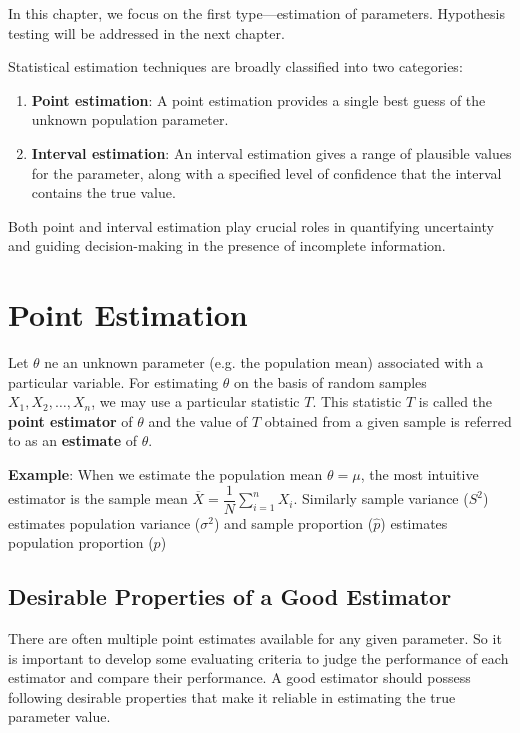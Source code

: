 \documentclass[twoside]{book}
\begin{document}
In this chapter, we focus on the first type—{estimation of parameters}. Hypothesis testing will be addressed in the next chapter.

Statistical estimation techniques are broadly classified into two categories:

\begin{enumerate}
    \item \textbf{Point estimation}: A point estimation provides a single best guess of the unknown population parameter.

    \item \textbf{Interval estimation}: An interval estimation gives a range of plausible values for the parameter, along with a specified level of confidence that the interval contains the true value.
\end{enumerate}

Both point and interval estimation play crucial roles in quantifying uncertainty and guiding decision-making in the presence of incomplete information.


\section{Point Estimation}
Let $\theta$ ne an unknown parameter (e.g. the population mean) associated with a particular variable. For estimating $\theta$ on the basis of random samples $X_1, X_2, \dots, X_n$, we may use a particular statistic $ T $. This statistic $T$ is called the \textbf{point estimator} of $\theta$ and the value of $T$ obtained from a given sample is referred to as an \textbf{estimate} of $\theta$.

\textbf{Example}: When we estimate the population mean $\theta = \mu$, the most intuitive estimator is the sample mean $\overline{X} = \dfrac{1}{N}\sum_{i=1}^{n}X_i$. Similarly sample variance (\( S^2 \)) estimates population variance (\( \sigma^2 \)) and sample proportion (\( \hat{p} \)) estimates population proportion (\( p \))


\subsection{Desirable Properties of a Good Estimator}
There are often multiple point estimates available for any given parameter. So it is important to develop some evaluating criteria to judge the performance of each estimator and compare their performance. A good estimator should possess following desirable properties that make it reliable in estimating the true parameter value.
\end{document}
